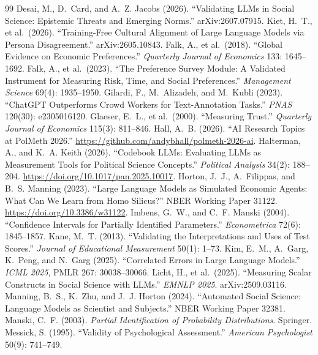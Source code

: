 \documentclass[10pt,letterpaper]{article}
\begin{document}
\begin{thebibliography}{99}
 Desai, M., D.~Card, and A.~Z. Jacobs (2026). ``Validating LLMs in Social Science: Epistemic Threats and Emerging Norms.'' arXiv:2607.07915.
 Kiet, H.~T., et al.\ (2026). ``Training-Free Cultural Alignment of Large Language Models via Persona Disagreement.'' arXiv:2605.10843.
 Falk, A., et al.\ (2018). ``Global Evidence on Economic Preferences.'' \textit{Quarterly Journal of Economics} 133: 1645--1692.
 Falk, A., et al.\ (2023). ``The Preference Survey Module: A Validated Instrument for Measuring Risk, Time, and Social Preferences.'' \textit{Management Science} 69(4): 1935--1950.
 Gilardi, F., M.~Alizadeh, and M.~Kubli (2023). ``ChatGPT Outperforms Crowd Workers for Text-Annotation Tasks.'' \textit{PNAS} 120(30): e2305016120.
 Glaeser, E.~L., et al.\ (2000). ``Measuring Trust.'' \textit{Quarterly Journal of Economics} 115(3): 811--846.
 Hall, A.~B. (2026). ``AI Research Topics at PolMeth 2026.'' \url{https://github.com/andybhall/polmeth-2026-ai}.
 Halterman, A., and K.~A. Keith (2026). ``Codebook LLMs: Evaluating LLMs as Measurement Tools for Political Science Concepts.'' \textit{Political Analysis} 34(2): 188--204. \url{https://doi.org/10.1017/pan.2025.10017}.
 Horton, J.~J., A.~Filippas, and B.~S. Manning (2023). ``Large Language Models as Simulated Economic Agents: What Can We Learn from Homo Silicus?'' NBER Working Paper 31122. \url{https://doi.org/10.3386/w31122}.
 Imbens, G.~W., and C.~F. Manski (2004). ``Confidence Intervals for Partially Identified Parameters.'' \textit{Econometrica} 72(6): 1845--1857.
 Kane, M.~T. (2013). ``Validating the Interpretations and Uses of Test Scores.'' \textit{Journal of Educational Measurement} 50(1): 1--73.
 Kim, E.~M., A.~Garg, K.~Peng, and N.~Garg (2025). ``Correlated Errors in Large Language Models.'' \textit{ICML 2025}, PMLR 267: 30038--30066.
 Licht, H., et al.\ (2025). ``Measuring Scalar Constructs in Social Science with LLMs.'' \textit{EMNLP 2025}. arXiv:2509.03116.
 Manning, B.~S., K.~Zhu, and J.~J. Horton (2024). ``Automated Social Science: Language Models as Scientist and Subjects.'' NBER Working Paper 32381.
 Manski, C.~F. (2003). \textit{Partial Identification of Probability Distributions}. Springer.
 Messick, S. (1995). ``Validity of Psychological Assessment.'' \textit{American Psychologist} 50(9): 741--749.

\end{thebibliography}
\end{document}
